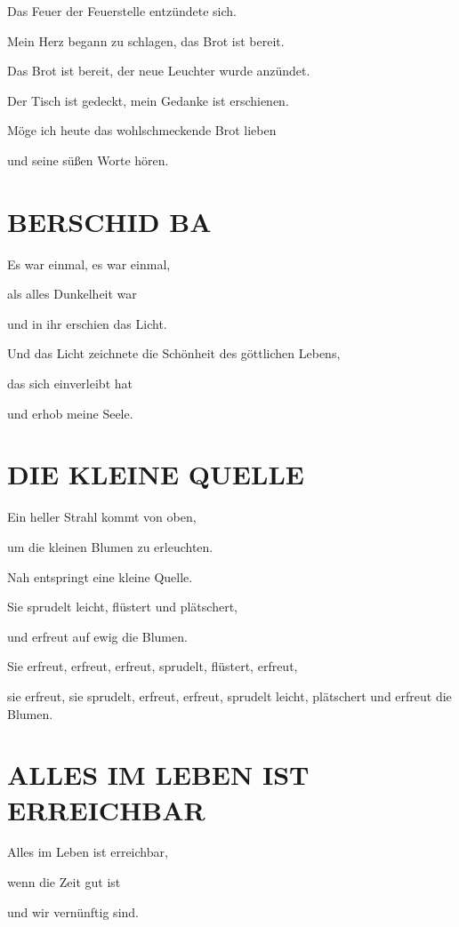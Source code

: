 \documentclass[11pt,a5paper,twoside]{article}
\begin{document}
Das Feuer der Feuerstelle entzündete sich.

Mein Herz begann zu schlagen, das Brot ist bereit.

Das Brot ist bereit, der neue Leuchter wurde anzündet.

Der Tisch ist gedeckt, mein Gedanke ist erschienen.

Möge ich heute das wohlschmeckende Brot lieben 

und seine süßen Worte hören.

\section[Berschid Ba]{BERSCHID BA}

Es war einmal, es war einmal,

als alles Dunkelheit war

und in ihr erschien das Licht.

Und das Licht zeichnete die Schönheit des göttlichen Lebens, 

das sich einverleibt hat 

und erhob meine Seele.

\section[Die kleine Quelle]{DIE KLEINE QUELLE}

Ein heller Strahl kommt von oben,

um die kleinen Blumen zu erleuchten. 

Nah entspringt eine kleine Quelle.

Sie sprudelt leicht, flüstert und plätschert,

und erfreut auf ewig die Blumen. 

Sie erfreut, erfreut, erfreut, sprudelt, flüstert, erfreut,

sie erfreut, sie sprudelt, erfreut, erfreut, sprudelt leicht, plätschert und erfreut die Blumen.



\section[Alles im Leben ist erreichbar]{ALLES IM LEBEN IST ERREICHBAR}

Alles im Leben ist erreichbar,

wenn die Zeit gut ist 

und wir vernünftig sind.\\
\end{document}
